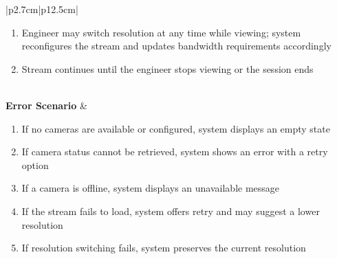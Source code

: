 \begin{table}[H]
\begin{tabular}{|p{2.7cm}|p{12.5cm}|}
\begin{minipage}[t]{\linewidth}
\begin{enumerate}[topsep=0pt,itemsep=1pt,parsep=0pt,partopsep=0pt]
                                                    displays the live video feed in a player window
                                              \item Engineer may switch resolution at any time while viewing; system reconfigures
                                                    the stream and updates bandwidth requirements accordingly
                                              \item Stream continues until the engineer stops viewing or the session ends
                                          \end{enumerate}
                                      \end{minipage}                                                                         \\
            \hline
            \textbf{Error Scenario} & \begin{minipage}[t]{\linewidth}
                                          \begin{enumerate}[topsep=0pt,itemsep=1pt,parsep=0pt,partopsep=0pt]
                                              \item If no cameras are available or configured, system displays an empty state
                                              \item If camera status cannot be retrieved, system shows an error with a retry option
                                              \item If a camera is offline, system displays an unavailable message
                                              \item If the stream fails to load, system offers retry and may suggest a lower
                                                    resolution
                                              \item If resolution switching fails, system preserves the current resolution
                                          \end{enumerate}
                                      \end{minipage}                                                                       \\
            \hline
        \end{tabular}
        \label{tab:eng-access-cameras}
    \end{table}
